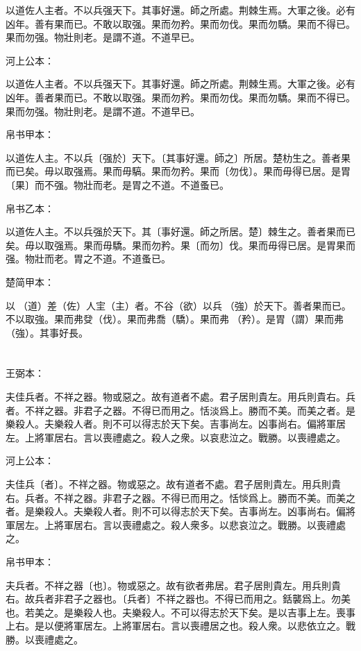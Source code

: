 \documentclass[a5paper]{ctexbook}
\begin{document}
    以道佐人主者。不以兵强天下。其事好還。師之所處。荆棘生焉。大軍之後。必有凶年。善有果而已。不敢以取强。果而勿矜。果而勿伐。果而勿驕。果而不得已。果而勿强。物壯則老。是謂不道。不道早已。

    河上公本：

    以道佐人主者。不以兵强天下。其事好還。師之所處。荆棘生焉。大軍之後。必有凶年。善者果而已。不敢以取强。果而勿矜。果而勿伐。果而勿驕。果而不得已。果而勿强。物壯則老。是謂不道。不道早已。

    帛书甲本：

    以道佐人主。不以兵〔强於〕天下。〔其事好還。師之〕所居。楚朸生之。善者果而已矣。毋以取强焉。果而毋䮦。果而勿矜。果而〔勿伐〕。果而毋得已居。是胃〔果〕而不强。物壯而老。是胃之不道。不道蚤已。

    帛书乙本：

    以道佐人主。不以兵强於天下。其〔事好還。師之所居。楚〕棘生之。善者果而已矣。毋以取强焉。果而毋驕。果而勿矜。果〔而勿〕伐。果而毋得已居。是胃果而强。物壯而老。胃之不道。不道蚤已。

    楚简甲本：

    以𧗟（道）差（佐）人宔（主）者。不谷（欲）以兵󶴘（強）於天下。善者果而已。不以取強。果而弗癹（伐）。果而弗喬（驕）。果而弗󶴙（矜）。是胃（謂）果而弗󶴘（強）。其事好長。

    \chapter{}
    王弼本：

    夫佳兵者。不祥之器。物或惡之。故有道者不處。君子居則貴左。用兵則貴右。兵者。不祥之器。非君子之器。不得已而用之。恬淡爲上。勝而不美。而美之者。是樂殺人。夫樂殺人者。則不可以得志於天下矣。吉事尚左。凶事尚右。偏將軍居左。上將軍居右。言以喪禮處之。殺人之衆。以哀悲泣之。戰勝。以喪禮處之。

    河上公本：

    夫佳兵〔者〕。不祥之器。物或惡之。故有道者不處。君子居則貴左。用兵則貴右。兵者。不祥之器。非君子之器。不得已而用之。恬惔爲上。勝而不美。而美之者。是樂殺人。夫樂殺人者。則不可以得志於天下矣。吉事尚左。凶事尚右。偏將軍居左。上將軍居右。言以喪禮處之。殺人衆多。以悲哀泣之。戰勝。以喪禮處之。

    帛书甲本：

    夫兵者。不祥之器〔也〕。物或惡之。故有欲者弗居。君子居則貴左。用兵則貴右。故兵者非君子之器也。〔兵者〕不祥之器也。不得已而用之。銛襲爲上。勿美也。若美之。是樂殺人也。夫樂殺人。不可以得志於天下矣。是以吉事上左。喪事上右。是以便將軍居左。上將軍居右。言以喪禮居之也。殺人衆。以悲依立之。戰勝。以喪禮處之。
\end{document}
